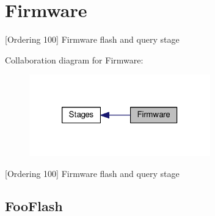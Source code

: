 \hypertarget{group___firmware}{\section{Firmware}
\label{group___firmware}
}


\mbox{[}Ordering 100\mbox{]} Firmware flash and query stage  


Collaboration diagram for Firmware\-:
\nopagebreak
\begin{figure}[H]
\begin{center}
\leavevmode
\includegraphics[width=222pt]{group___firmware}
\end{center}
\end{figure}
\mbox{[}Ordering 100\mbox{]} Firmware flash and query stage \hypertarget{FooFlash.py_FooFlash}{}\subsection{Foo\-Flash}\label{FooFlash.py_FooFlash}

